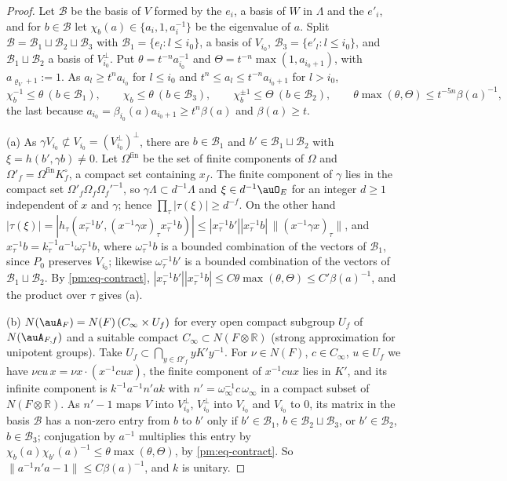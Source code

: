 \documentclass[10pt]{amsart}
\theoremstyle{definition}
\theoremstyle{remark}
\newcommand{\R}{\mathbb R}
\begin{document}
\begin{proof}
Let $\mathcal B$ be the basis of $V$ formed by the $e_i$, a basis of $W$ in $\Lambda$ and the
$e'_i$, and for $b\in\mathcal B$ let $\chi_b(a)\in\{a_i,1,a_i^{-1}\}$ be the eigenvalue of $a$. Split
$\mathcal B=\mathcal B_1\sqcup\mathcal B_2\sqcup\mathcal B_3$ with $\mathcal B_1=\{e_l:l\le i_0\}$,
a basis of $V_{i_0}$, $\mathcal B_3=\{e'_l:l\le i_0\}$, and $\mathcal B_1\sqcup\mathcal B_2$ a basis
of $V_{i_0}^\perp$. Put $\theta=t^{-n}a_{i_0}^{-1}$ and $\Theta=t^{-n}\max(1,a_{i_0+1})$, with
$a_{\varrho_V+1}:=1$. As $a_l\ge t^na_{i_0}$ for $l\le i_0$ and $t^n\le a_l\le t^{-n}a_{i_0+1}$ for
$l>i_0$,
\begin{equation}\label{pm:eq-contract}
\chi_b^{-1}\le\theta\ (b\in\mathcal B_1),\qquad\chi_b\le\theta\ (b\in\mathcal B_3),\qquad
\chi_b^{\pm1}\le\Theta\ (b\in\mathcal B_2),\qquad\theta\max(\theta,\Theta)\le t^{-5n}\beta(a)^{-1},
\end{equation}
the last because $a_{i_0}=\beta_{i_0}(a)a_{i_0+1}\ge t^n\beta(a)$ and $\beta(a)\ge t$.

(a) As $\gamma V_{i_0}\not\subset V_{i_0}=(V_{i_0}^\perp)^\perp$, there are $b\in\mathcal B_1$ and
$b'\in\mathcal B_1\sqcup\mathcal B_2$ with $\xi=h(b',\gamma b)\ne0$. Let $\Omega^{\mathrm{fin}}$ be
the set of finite components of $\Omega$ and $\Omega'_f=\Omega^{\mathrm{fin}}K_f^\circ$, a compact
set containing $x_f$. The finite component of $\gamma$ lies in the compact set
$\Omega'_f\Omega_f\Omega_f'^{-1}$, so $\gamma\Lambda\subset d^{-1}\Lambda$ and $\xi\in d^{-1}\auO_E$
for an integer $d\ge1$ independent of $x$ and $\gamma$; hence $\prod_\tau|\tau(\xi)|\ge d^{-f}$. On
the other hand
$|\tau(\xi)|=|h_\tau(x_\tau^{-1}b',(x^{-1}\gamma x)_\tau x_\tau^{-1}b)|\le|x_\tau^{-1}b'||x_\tau^{-1}b|
\,\|(x^{-1}\gamma x)_\tau\|$, and $x_\tau^{-1}b=k_\tau^{-1}a^{-1}\omega_\tau^{-1}b$, where
$\omega_\tau^{-1}b$ is a bounded combination of the vectors of $\mathcal B_1$, since $P_0$
preserves $V_{i_0}$; likewise $\omega_\tau^{-1}b'$ is a bounded combination of the vectors of
$\mathcal B_1\sqcup\mathcal B_2$. By \eqref{pm:eq-contract},
$|x_\tau^{-1}b'||x_\tau^{-1}b|\le C\theta\max(\theta,\Theta)\le C'\beta(a)^{-1}$, and the product over
$\tau$ gives (a).

(b) $N(\auA_F)=N(F)\,(C_\infty\times U_f)$ for every open compact subgroup $U_f$ of
$N(\auA_{F,f})$ and a suitable compact $C_\infty\subset N(F\otimes\R)$ (strong approximation for
unipotent groups). Take $U_f\subset\bigcap_{y\in\Omega'_f}yK'y^{-1}$. For $\nu\in N(F)$,
$c\in C_\infty$, $u\in U_f$ we have $\nu cu\,x=\nu x\cdot(x^{-1}cux)$, the finite component of
$x^{-1}cux$ lies in $K'$, and its infinite component is $k^{-1}a^{-1}n'ak$ with
$n'=\omega_\infty^{-1}c\,\omega_\infty$ in a compact subset of $N(F\otimes\R)$. As $n'-1$ maps
$V$ into $V_{i_0}^\perp$, $V_{i_0}^\perp$ into $V_{i_0}$ and $V_{i_0}$ to $0$, its matrix in the basis
$\mathcal B$ has a non-zero entry from $b$ to $b'$ only if $b'\in\mathcal B_1$,
$b\in\mathcal B_2\sqcup\mathcal B_3$, or $b'\in\mathcal B_2$, $b\in\mathcal B_3$; conjugation by
$a^{-1}$ multiplies this entry by $\chi_b(a)\chi_{b'}(a)^{-1}\le\theta\max(\theta,\Theta)$, by
\eqref{pm:eq-contract}. So $\|a^{-1}n'a-1\|\le C\beta(a)^{-1}$, and $k$ is unitary.


\end{proof}
\end{document}
